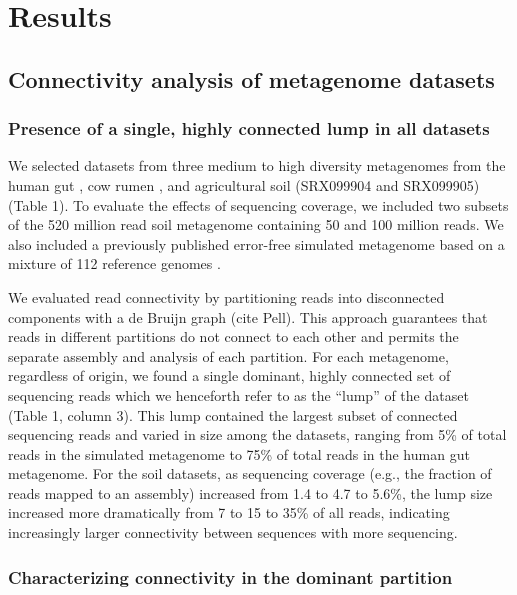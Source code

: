 \documentclass[10pt]{article}
\begin{document}
\section*{Results}

\subsection*{Connectivity analysis of metagenome datasets}

\subsubsection*{Presence of a single, highly connected lump in all datasets}
We selected datasets from three medium to high diversity
metagenomes from the human gut \cite{Qin:2010p189}, cow rumen
\cite{Hess:2011p686}, and agricultural soil (SRX099904 and SRX099905)
(Table 1).  To
evaluate the effects of sequencing coverage, we included two subsets
of the 520 million read soil metagenome containing 50 and 100 million
reads.  We also included a previously published error-free simulated
metagenome based on a mixture of 112 reference genomes
\cite{Pignatelli:2011p742}.

We evaluated read connectivity by partitioning reads into disconnected
components with a de Bruijn graph (cite Pell).  This approach
guarantees that reads in different partitions do not connect to each
other and permits the separate assembly and analysis of each
partition.  For each metagenome, regardless of origin, we found a
single dominant, highly connected set of sequencing reads which we
henceforth refer to as the ``lump'' of the dataset (Table 1, column
3).  This lump contained the largest subset of connected sequencing
reads and varied in size among the datasets, ranging from 5\% of total
reads in the simulated metagenome to 75\% of total reads in the human
gut metagenome.  For the soil datasets, as sequencing coverage (e.g.,
the fraction of reads mapped to an assembly) increased from 1.4 to 4.7
to 5.6\%, the lump size increased more dramatically from 7 to 15 to
35\% of all reads, indicating increasingly larger connectivity between
sequences with more sequencing.

\subsubsection*{Characterizing connectivity in the dominant partition}
\end{document}
